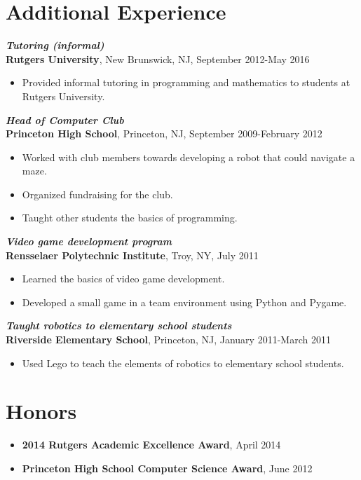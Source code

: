 \documentclass[12pt]{article}
\begin{document}
\section*{Additional Experience}

\textit{\textbf{Tutoring (informal)}} \\
\textbf{Rutgers University}, New Brunswick, NJ, September 2012-May 2016
\begin{itemize}
\item
Provided informal tutoring in programming and mathematics to students at Rutgers University.
\end{itemize}

\textit{\textbf{Head of Computer Club}} \\
\textbf{Princeton High School}, Princeton, NJ, September 2009-February 2012
\begin{itemize}
\item
Worked with club members towards developing a robot that could navigate a maze.
\item
Organized fundraising for the club.
\item
Taught other students the basics of programming.
\end{itemize}

\textit{\textbf{Video game development program}} \\
\textbf{Rensselaer Polytechnic Institute}, Troy, NY, July 2011
\begin{itemize}
\item
Learned the basics of video game development.
\item
Developed a small game in a team environment using Python and Pygame.
\end{itemize}

\textit{\textbf{Taught robotics to elementary school students}} \\
\textbf{Riverside Elementary School}, Princeton, NJ, January 2011-March 2011
\begin{itemize}
\item
Used Lego to teach the elements of robotics to elementary school students.
\end{itemize}

\section*{Honors}
\begin{itemize}
\item
\textbf{2014 Rutgers Academic Excellence Award}, April 2014
\item
\textbf{Princeton High School Computer Science Award}, June 2012
\end{itemize}
\end{document}
